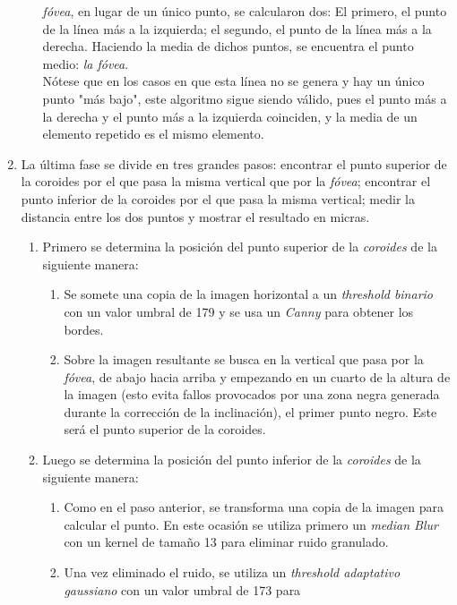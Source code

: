 \begin{enumerate}
\begin{enumerate}[label*=\arabic*.]
    \emph{fóvea}, en lugar de un único punto, se calcularon dos: El
    primero, el punto de la línea más a la izquierda; el segundo, el
    punto de la línea más a la derecha. Haciendo la media de dichos
    puntos, se encuentra el
    punto medio: \emph{la fóvea}. \\
    Nótese que en los casos en que esta línea no se genera y hay un
    único punto "más bajo", este algoritmo sigue siendo válido, pues
    el punto más a la derecha y el punto más a la izquierda coinciden,
    y la media de un elemento repetido es el mismo elemento.
  \end{enumerate}
\item La última fase se divide en tres grandes pasos: encontrar el
  punto superior de la coroides por el que pasa la misma vertical que
  por la \emph{fóvea}; encontrar el punto inferior de la coroides por
  el que pasa la misma vertical; medir la distancia entre los dos
  puntos y mostrar el resultado en micras.
  \begin{enumerate}[label*=\arabic*.]
  \item Primero se determina la posición del punto superior de la
    \emph{coroides} de la siguiente manera:
    \begin{enumerate}[label*=\arabic*.]
    \item Se somete una copia de la imagen horizontal a un
      \emph{threshold binario} con un valor umbral de 179 y se usa un
      \emph{Canny} para obtener los bordes.
    \item Sobre la imagen resultante se busca en la vertical que pasa
      por la \emph{fóvea}, de abajo hacia arriba y empezando en un
      cuarto de la altura de la imagen (esto evita fallos provocados
      por una zona negra generada durante la corrección de la
      inclinación), el primer punto negro. Este será el punto superior
      de la coroides.
    \end{enumerate}
  \item Luego se determina la posición del punto inferior de la
    \emph{coroides} de la siguiente manera:
    \begin{enumerate}[label*=\arabic*.]
    \item Como en el paso anterior, se transforma una copia de la
      imagen para calcular el punto. En este ocasión se utiliza
      primero un \emph{median Blur} con un kernel de tamaño 13 para
      eliminar ruido granulado.
    \item Una vez eliminado el ruido, se utiliza un \emph{threshold
        adaptativo gaussiano} con un valor umbral de 173 para

\end{enumerate}
\end{enumerate}
\end{enumerate}
